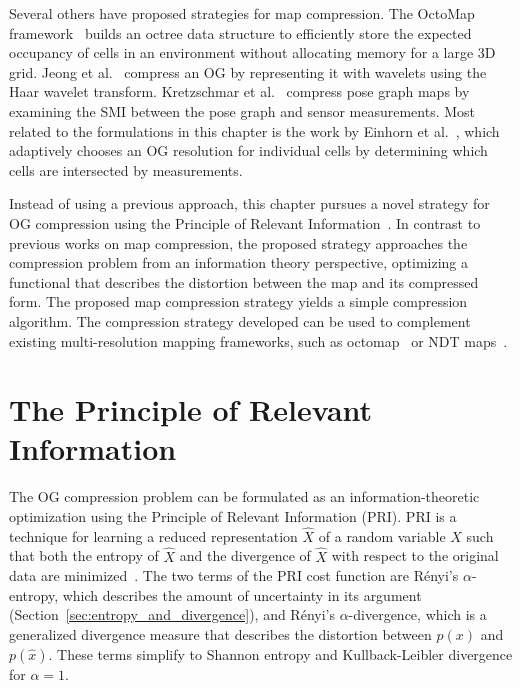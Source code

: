 Several others have proposed strategies for map compression. The OctoMap
framework~\cite{wurm2010octomap} builds an octree data structure to efficiently store the
expected occupancy of cells in an environment without allocating memory for a
large 3D grid. Jeong et al.~\cite{im2010real} compress an OG by representing it with
wavelets using the Haar wavelet transform. Kretzschmar et
al.~\cite{kretzschmar2012information} compress
pose graph maps by examining the SMI between the pose
graph and sensor measurements. Most related to the formulations in this chapter is the
work by Einhorn et al.~\cite{einhorn2011finding}, which adaptively chooses an OG resolution for
individual cells by determining which cells are intersected by measurements.

Instead of using a previous approach, this chapter pursues a novel strategy for OG compression
using the Principle of Relevant Information~\cite{principe2010information}. In contrast to previous
works on map compression, the proposed strategy approaches the compression problem from an information
theory perspective, optimizing a functional that describes the distortion between the
map and its compressed form. The proposed map compression strategy yields a
simple compression algorithm. The compression strategy developed can be used to complement
existing multi-resolution mapping frameworks, such as
octomap~\cite{wurm2010octomap} or NDT maps~\cite{saarinen2013normal}.

\section{The Principle of Relevant Information}
\label{sec:pri}

The OG compression problem can be formulated as an information-theoretic optimization
using the Principle of Relevant Information (PRI). PRI is a technique for learning a
reduced representation $\hat{X}$ of a random variable $X$ such that both the entropy of
$\hat{X}$ and the divergence of $\hat{X}$ with respect to the original data are
minimized~\cite{principe2010information}.
%
%
The two terms of the PRI cost function are R\'{e}nyi's $\alpha$-entropy, which describes
the amount of uncertainty in its argument (Section~\ref{sec:entropy_and_divergence}),
and R\'{e}nyi's $\alpha$-divergence, which is a generalized divergence
measure that describes the distortion between $p(x)$ and $p(\hat{x})$. These terms simplify
to Shannon entropy and Kullback-Leibler divergence for $\alpha = 1$.

